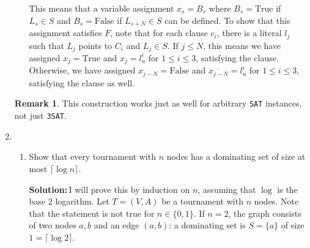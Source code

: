 \documentclass{amsart}
\theoremstyle{plain}
\theoremstyle{definition}
\newtheorem*{rk}{\textbf{Remark}}
\newcommand{\sol}{\textbf{Solution:\,}}
\begin{document}
\begin{enumerate}[label=\textbf{Exercise \arabic*:}, leftmargin=0cm, labelwidth=-0.2cm, align=left]
\begin{itemize}
                This means that a variable assignment $x_s = B_s$ where $B_s = \text{True}$
                if $L_s \in S$ and $B_s = \text{False}$ if $L_{s+N} \in S$ can be defined.
                To show that this assignment satisfies $F$, note that for each clause $c_i$, there is
                a literal $l_j$ such that $L_j$ points to $C_i$ and $L_j \in S$.
                If $j \leq N$, this means we have assigned $x_j = \text{True}$ and $x_j = l^i_u$ for $1 \leq i \leq 3$,
                satisfying the clause.
                Otherwise, we have assigned $x_{j-N} = \text{False}$ and $\overline{x_{j-N}} = l^i_u$ for $1 \leq i \leq 3$,
                satisfying the clause as well.

            \end{itemize}

            \begin{rk}
                This construction works just as well for arbitrary \verb|SAT| instances, not just \verb|3SAT|.
            \end{rk}

        \newpage

        \item \textcolor{white} a

             \begin{enumerate}[label=\alph*)]

            \item \label{itm:2a}
            Show that every tournament with $n$ nodes has a dominating set of size at most $\lceil \log n \rceil$.

            \sol I will prove this by induction on $n$, assuming that $\log$ is the base $2$ logarithm.
            Let $T = (V, A)$ be a tournament with $n$ nodes.
            Note that the statement is not true for $n \in \{0, 1\}$.
            If $n=2$, the graph consists of two nodes $a, b$ and an edge $(a, b)$: a dominating set is $S = \{a\}$
            of size $1 = \lceil \log 2 \rceil$.


\end{enumerate}
\end{enumerate}
\end{document}
